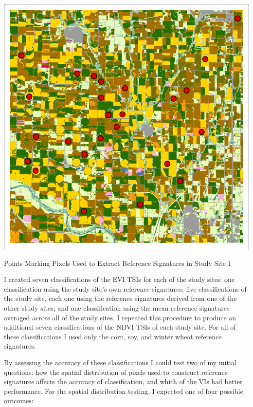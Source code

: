 \begin{ssfigure}
  \centering
  \includegraphics[width=.7\textwidth]{Graphics/Testing/clip1_30mCDL_smpl_old.pdf}
  \caption{Points Marking Pixels Used to Extract Reference Signatures in Study Site 1}
  \label{fig:refpoints}
\end{ssfigure}

I created seven classifications of the EVI TSIs for each of the study sites: one classification using the study site's own reference signatures; five classifications of the study site, each one using the reference signatures derived from one of the other study sites; and one classification using the mean reference signatures averaged across all of the study sites. I repeated this procedure to produce an additional seven classifications of the NDVI TSIs of each study site. For all of these classifications I used only the corn, soy, and winter wheat reference signatures.

By assessing the accuracy of these classifications I could test two of my initial questions: how the spatial distribution of pixels used to construct reference signatures affects the accuracy of classification, and which of the VIs had better performance. For the spatial distribution testing, I expected one of four possible outcomes:


